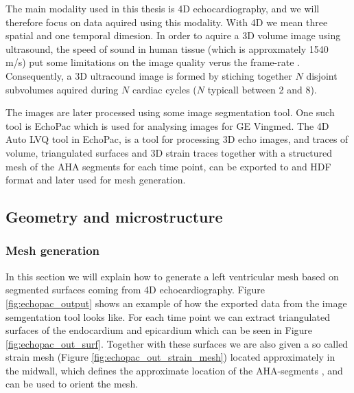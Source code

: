 The main modality used in this thesis is 4D echocardiography, and we
will therefore focus on data aquired using this modality.
With 4D we mean three spatial and one temporal dimesion.
In order to aquire a 3D volume image using ultrasound, the speed of sound in
human tissue (which is approxmately 1540 m/s) put some limitations on
the image quality verus the frame-rate \cite{rabben2010technical}.
Consequently, a 3D ultracound image is formed by stiching together $N$
disjoint subvolumes aquired during $N$ cardiac cycles ($N$ typicall
between 2 and 8)\cite{brekke2007volume}.

The images are later processed using some image segmentation tool.
One such tool is EchoPac which is used for analysing images for GE
Vingmed. The 4D Auto LVQ tool in EchoPac, is a tool for processing 3D
echo images, and traces of volume, triangulated surfaces and 3D strain
traces together with a structured mesh of the AHA segments for each
time point, can be exported to and HDF format and later used for mesh generation. 






\subsection{Geometry and microstructure}


\subsubsection{Mesh generation}
In this section we will explain how to generate a left ventricular
mesh based on segmented surfaces coming from 4D echocardiography.
Figure \ref{fig:echopac_output} shows an example of how the exported data
from the image semgentation tool looks like. For each time point we
can extract triangulated surfaces of the endocardium and epicardium
which can be seen in Figure \ref{fig:echopac_out_surf}. Together with
these surfaces we are also given a so called strain mesh (Figure
\ref{fig:echopac_out_strain_mesh}) located approximately in the
midwall, which defines the approximate location of the AHA-segments
\cite{cerqueira2002standardized}, and can be used to orient the mesh. 



